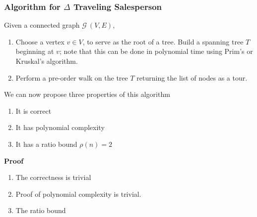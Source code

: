 \documentclass{article}
\theoremstyle{definition}
\begin{document}
\subsubsection{Algorithm for $\Delta$ Traveling Salesperson}
Given a connected graph $\mathcal{G}\ (V,E)$,
\begin{enumerate}
    \item
        Choose a vertex $v \in V$, to serve as the root of a tree.
        Build a spanning tree $T$ beginning at $v$;
        note that this can be done in polynomial time using Prim's or Kruskal's algorithm.
    \item
        Perform a pre-order walk on the tree $T$ returning the list of nodes as a tour.
\end{enumerate}

We can now propose three properties of this algorithm
\begin{enumerate}
    \item It is correct
    \item It has polynomial complexity
    \item It has a ratio bound $\rho(n) = 2$
\end{enumerate}
\textbf{Proof}
\begin{enumerate}
    \item
        The correctness is trivial
    \item
        Proof of polynomial complexity is trivial.
    \item
        The ratio bound
\end{enumerate}
\end{document}
